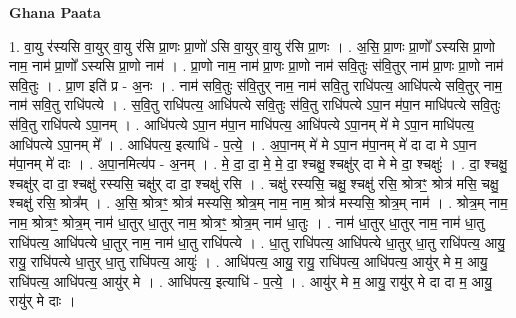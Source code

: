 \documentclass[17pt]{extarticle}
\begin{document}
\textbf{Ghana Paata } \newline

1. वा॒यु र॑स्यसि वा॒युर् वा॒यु र॑सि प्रा॒णः प्रा॒णो॑ ऽसि वा॒युर् वा॒यु र॑सि प्रा॒णः । . अ॒सि॒ प्रा॒णः प्रा॒णो᳚ ऽस्यसि प्रा॒णो नाम॒ नाम॑ प्रा॒णो᳚ ऽस्यसि प्रा॒णो नाम॑ । . प्रा॒णो नाम॒ नाम॑ प्रा॒णः प्रा॒णो नाम॑ सवि॒तुः स॑वि॒तुर् नाम॑ प्रा॒णः प्रा॒णो नाम॑ सवि॒तुः । . प्रा॒ण इति॑ प्र - अ॒नः । . नाम॑ सवि॒तुः स॑वि॒तुर् नाम॒ नाम॑ सवि॒तु राधि॑पत्य॒ आधि॑पत्ये सवि॒तुर् नाम॒ नाम॑ सवि॒तु राधि॑पत्ये । . स॒वि॒तु राधि॑पत्य॒ आधि॑पत्ये सवि॒तुः स॑वि॒तु राधि॑पत्ये ऽपा॒न म॑पा॒न माधि॑पत्ये सवि॒तुः स॑वि॒तु राधि॑पत्ये ऽपा॒नम् । . आधि॑पत्ये ऽपा॒न म॑पा॒न माधि॑पत्य॒ आधि॑पत्ये ऽपा॒नम् मे॑ मे ऽपा॒न माधि॑पत्य॒ आधि॑पत्ये ऽपा॒नम् मे᳚ । . आधि॑पत्य॒ इत्याधि॑ - प॒त्ये॒ । . अ॒पा॒नम् मे॑ मे ऽपा॒न म॑पा॒नम् मे॑ दा दा मे ऽपा॒न म॑पा॒नम् मे॑ दाः । . अ॒पा॒नमित्य॑प - अ॒नम् । . मे॒ दा॒ दा॒ मे॒ मे॒ दा॒ श्चक्षु॒ श्चक्षु॑र् दा मे मे दा॒ श्चक्षुः॑ । . दा॒ श्चक्षु॒ श्चक्षु॑र् दा दा॒ श्चक्षु॑ रस्यसि॒ चक्षु॑र् दा दा॒ श्चक्षु॑ रसि । . चक्षु॑ रस्यसि॒ चक्षु॒ श्चक्षु॑ रसि॒ श्रोत्रꣳ॒॒ श्रोत्र॑ मसि॒ चक्षु॒ श्चक्षु॑ रसि॒ श्रोत्र᳚म् । . अ॒सि॒ श्रोत्रꣳ॒॒ श्रोत्र॑ मस्यसि॒ श्रोत्र॒म् नाम॒ नाम॒ श्रोत्र॑ मस्यसि॒ श्रोत्र॒म् नाम॑ । . श्रोत्र॒म् नाम॒ नाम॒ श्रोत्रꣳ॒॒ श्रोत्र॒म् नाम॑ धा॒तुर् धा॒तुर् नाम॒ श्रोत्रꣳ॒॒ श्रोत्र॒म् नाम॑ धा॒तुः । . नाम॑ धा॒तुर् धा॒तुर् नाम॒ नाम॑ धा॒तु राधि॑पत्य॒ आधि॑पत्ये धा॒तुर् नाम॒ नाम॑ धा॒तु राधि॑पत्ये । . धा॒तु राधि॑पत्य॒ आधि॑पत्ये धा॒तुर् धा॒तु राधि॑पत्य॒ आयु॒ रायु॒ राधि॑पत्ये धा॒तुर् धा॒तु राधि॑पत्य॒ आयुः॑ । . आधि॑पत्य॒ आयु॒ रायु॒ राधि॑पत्य॒ आधि॑पत्य॒ आयु॑र् मे म॒ आयु॒ राधि॑पत्य॒ आधि॑पत्य॒ आयु॑र् मे । . आधि॑पत्य॒ इत्याधि॑ - प॒त्ये॒ । . आयु॑र् मे म॒ आयु॒ रायु॑र् मे दा दा म॒ आयु॒ रायु॑र् मे दाः । \newline
\end{document}
